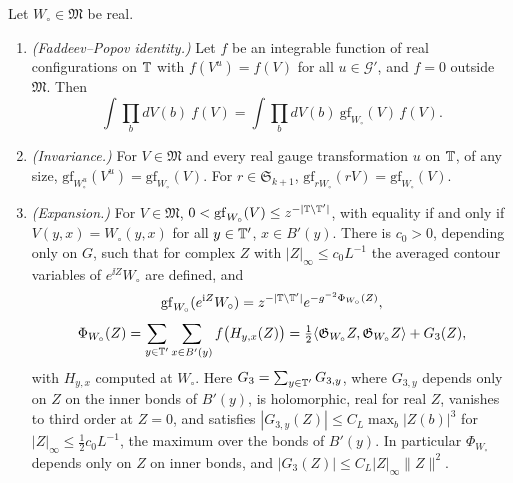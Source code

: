 \begin{lemma}\label{lem:exp-gauge}
Let $W_\circ\in\mathfrak M$ be real.
\begin{enumerate}[label=(\alph*)]
\item \emph{(Faddeev--Popov identity.)} Let $f$ be an integrable function of real configurations on $\mathbb T$ with $f(V^u)=f(V)$ for all $u\in\mathcal G'$, and $f=0$ outside $\mathfrak M$. Then
\[
\int\prod_bdV(b)\ f(V)=\int\prod_bdV(b)\ \mathrm{gf}_{W_\circ}(V)\,f(V).
\]
\item \emph{(Invariance.)} For $V\in\mathfrak M$ and every real gauge transformation $u$ on $\mathbb T$, of any size, $\mathrm{gf}_{W_\circ^u}(V^u)=\mathrm{gf}_{W_\circ}(V)$. For $r\in\mathfrak S_{k+1}$, $\mathrm{gf}_{rW_\circ}(rV)=\mathrm{gf}_{W_\circ}(V)$.
\item \emph{(Expansion.)} For $V\in\mathfrak M$, $0<\mathrm{gf}_{W_\circ}(V)\le z^{-|\mathbb T\setminus\mathbb T'|}$, with equality if and only if $V(y,x)=W_\circ(y,x)$ for all $y\in\mathbb T'$, $x\in B'(y)$. There is $c_0>0$, depending only on $G$, such that for complex $Z$ with $|Z|_\infty\le c_0L^{-1}$ the averaged contour variables of $e^{\ii Z}W_\circ$ are defined, and
\[
\mathrm{gf}_{W_\circ}(e^{\mathrm i Z}W_\circ)=z^{-|\mathbb T\setminus\mathbb T'|}e^{-g^{-2}\Phi_{W_\circ}(Z)},
\]
\[
\Phi_{W_\circ}(Z)=\sum_{y\in\mathbb T'}\sum_{x\in B'(y)}f\big(H_{y,x}(Z)\big)=\tfrac12\langle \mathfrak G_{W_\circ}Z,\mathfrak G_{W_\circ}Z\rangle+G_3(Z),
\]
with $H_{y,x}$ computed at $W_\circ$. Here $G_3=\sum_{y\in\mathbb T'}G_{3,y}$, where $G_{3,y}$ depends only on $Z$ on the inner bonds of $B'(y)$, is holomorphic, real for real $Z$, vanishes to third order at $Z=0$, and satisfies $|G_{3,y}(Z)|\le C_L\max_b|Z(b)|^3$ for $|Z|_\infty\le\frac12c_0L^{-1}$, the maximum over the bonds of $B'(y)$. In particular $\Phi_{W_\circ}$ depends only on $Z$ on inner bonds, and $|G_3(Z)|\le C_L|Z|_\infty\|Z\|^2$.
\end{enumerate}
\end{lemma}

